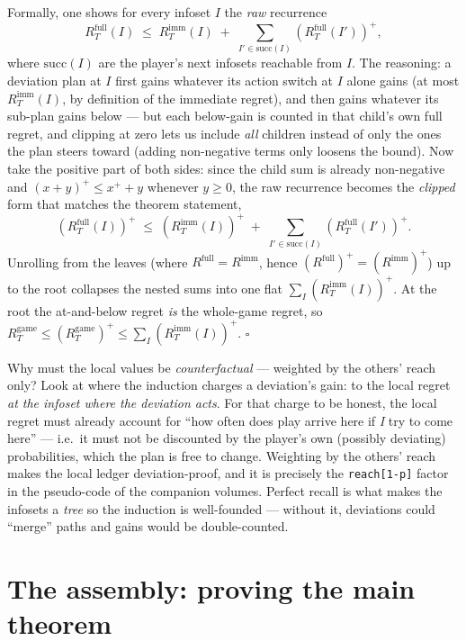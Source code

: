 \documentclass[11pt,a4paper]{article}
\newcommand{\pos}[1]{\left(#1\right)^{\!+}}
\begin{document}
Formally, one shows for every infoset $I$ the \emph{raw} recurrence
\[
R_T^{\mathrm{full}}(I) \;\le\; R_T^{\mathrm{imm}}(I)
\;+\; \sum_{I' \in \mathrm{succ}(I)} \pos{R_T^{\mathrm{full}}(I')},
\]
where $\mathrm{succ}(I)$ are the player's next infosets reachable from $I$.
The reasoning: a deviation plan at $I$ first gains whatever its action switch
at $I$ alone gains (at most $R_T^{\mathrm{imm}}(I)$, by definition of the
immediate regret), and then gains whatever its sub-plan gains below ---
but each below-gain is counted in that child's own full regret, and clipping
at zero lets us include \emph{all} children instead of only the ones the plan
steers toward (adding non-negative terms only loosens the bound). Now take the
positive part of both sides: since the child sum is already non-negative and
$\pos{x+y} \le x^{+}+y$ whenever $y \ge 0$, the raw recurrence becomes the
\emph{clipped} form that matches the theorem statement,
\[
\pos{R_T^{\mathrm{full}}(I)} \;\le\; \pos{R_T^{\mathrm{imm}}(I)}
\;+\; \sum_{I' \in \mathrm{succ}(I)} \pos{R_T^{\mathrm{full}}(I')}.
\]
Unrolling from the leaves (where $R^{\mathrm{full}} = R^{\mathrm{imm}}$, hence
$\pos{R^{\mathrm{full}}} = \pos{R^{\mathrm{imm}}}$) up to the root collapses the
nested sums into one flat $\sum_{I}\pos{R_T^{\mathrm{imm}}(I)}$. At the root the
at-and-below regret \emph{is} the whole-game regret, so
$R_T^{\mathrm{game}} \le \pos{R_T^{\mathrm{game}}}
\le \sum_{I}\pos{R_T^{\mathrm{imm}}(I)}$. $\square$

\begin{intuition}
Why must the local values be \emph{counterfactual} --- weighted by the
others' reach only? Look at where the induction charges a deviation's gain:
to the local regret \emph{at the infoset where the deviation acts}. For that
charge to be honest, the local regret must already account for ``how often
does play arrive here if \emph{I} try to come here'' --- i.e.\ it must not be
discounted by the player's own (possibly deviating) probabilities, which the
plan is free to change. Weighting by the others' reach makes the local
ledger deviation-proof, and it is precisely the
\texttt{reach[1-p]} factor in the pseudo-code of the companion volumes.
Perfect recall is what makes the infosets a \emph{tree} so the induction is
well-founded --- without it, deviations could ``merge'' paths and gains would
be double-counted.
\end{intuition}

\section{The assembly: proving the main theorem}
\end{document}
